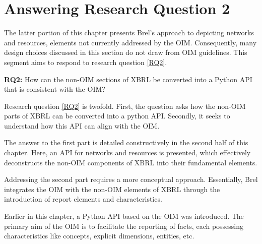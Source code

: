 \section{Answering Research Question 2}
\label{sec:answer_research_question_2}

The latter portion of this chapter presents Brel's approach to depicting networks and resources,
elements not currently addressed by the OIM.
Consequently, many design choices discussed in this section do not draw from OIM guidelines.
This segment aims to respond to research question \ref{RQ2}.

\begin{displayquote}
    \textbf{RQ2:} How can the non-OIM sections of XBRL be converted into a Python API that is consistent with the OIM?
\end{displayquote}

Research question \ref{RQ2} is twofold.
First, the question asks how the non-OIM parts of XBRL can be converted into a python API.
Secondly, it seeks to understand how this API can align with the OIM.

The answer to the first part is detailed constructively in the second half of this chapter. 
Here, an API for networks and resources is presented, which effectively deconstructs the non-OIM components of XBRL into their fundamental elements.

Addressing the second part requires a more conceptual approach. 
Essentially, Brel integrates the OIM with the non-OIM elements of XBRL through the introduction of report elements and characteristics.

Earlier in this chapter, a Python API based on the OIM was introduced. 
The primary aim of the OIM is to facilitate the reporting of facts, each possessing characteristics like concepts, explicit dimensions, entities, etc.

